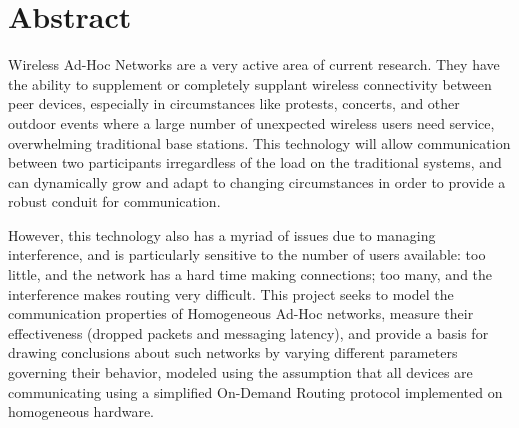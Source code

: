 \section{Abstract}
Wireless Ad-Hoc Networks are a very active area of current research.
They have the ability to supplement or completely supplant wireless connectivity between peer devices,
especially in circumstances like protests, concerts, and other outdoor events where a large number of
unexpected wireless users need service, overwhelming traditional base stations.
This technology will allow communication between two participants irregardless of the load on the
traditional systems, and can dynamically grow and adapt to changing circumstances in order to provide
a robust conduit for communication.

However, this technology also has a myriad of issues due to managing interference,
and is particularly sensitive to the number of users available: 
too little, and the network has a hard time making connections;
too many, and the interference makes routing very difficult.
This project seeks to model the communication properties of Homogeneous Ad-Hoc networks, 
measure their effectiveness (dropped packets and messaging latency),
and provide a basis for drawing conclusions about such networks 
by varying different parameters governing their behavior, 
modeled using the assumption that all devices are communicating 
using a simplified On-Demand Routing protocol implemented on homogeneous hardware.
